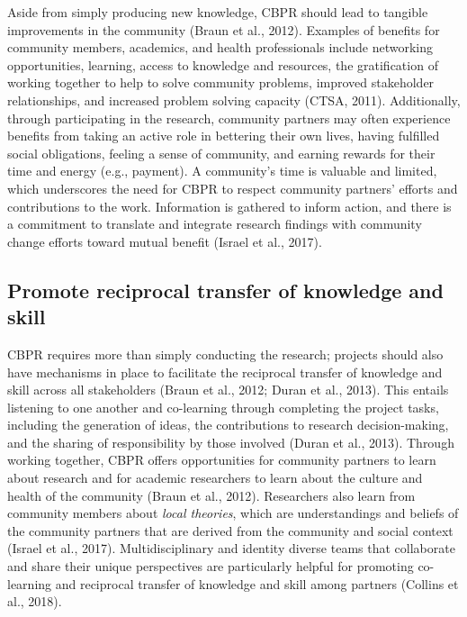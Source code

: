 \documentclass[
  11pt,
]{book}
\begin{document}
Aside from simply producing new knowledge, CBPR should lead to tangible improvements in the community (Braun et al., 2012). Examples of benefits for community members, academics, and health professionals include networking opportunities, learning, access to knowledge and resources, the gratification of working together to help to solve community problems, improved stakeholder relationships, and increased problem solving capacity (CTSA, 2011). Additionally, through participating in the research, community partners may often experience benefits from taking an active role in bettering their own lives, having fulfilled social obligations, feeling a sense of community, and earning rewards for their time and energy (e.g., payment). A community's time is valuable and limited, which underscores the need for CBPR to respect community partners' efforts and contributions to the work. Information is gathered to inform action, and there is a commitment to translate and integrate research findings with community change efforts toward mutual benefit (Israel et al., 2017).

\hypertarget{promote-reciprocal-transfer-of-knowledge-and-skill}{%
\subsection{Promote reciprocal transfer of knowledge and skill}\label{promote-reciprocal-transfer-of-knowledge-and-skill}}

CBPR requires more than simply conducting the research; projects should also have mechanisms in place to facilitate the reciprocal transfer of knowledge and skill across all stakeholders (Braun et al., 2012; Duran et al., 2013). This entails listening to one another and co-learning through completing the project tasks, including the generation of ideas, the contributions to research decision-making, and the sharing of responsibility by those involved (Duran et al., 2013). Through working together, CBPR offers opportunities for community partners to learn about research and for academic researchers to learn about the culture and health of the community (Braun et al., 2012). Researchers also learn from community members about \emph{local theories}, which are understandings and beliefs of the community partners that are derived from the community and social context (Israel et al., 2017). Multidisciplinary and identity diverse teams that collaborate and share their unique perspectives are particularly helpful for promoting co-learning and reciprocal transfer of knowledge and skill among partners (Collins et al., 2018).
\end{document}
